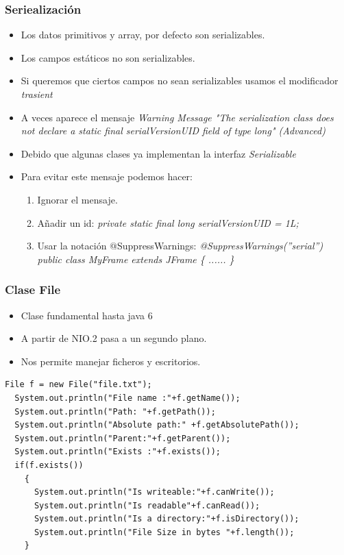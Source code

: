 \documentclass{beamer}
\begin{document}
\begin{frame}[fragile]
\frametitle{Seriealización}
\begin{itemize}[<+->]
\item Los datos primitivos y array, por defecto son serializables.
\item Los campos estáticos no son serializables.
\item Si queremos que ciertos campos no sean serializables usamos el modificador \emph{trasient}
\item A veces aparece el mensaje \emph{Warning Message "The serialization class does not declare a static final serialVersionUID field of type long" (Advanced)}
\item Debido que algunas clases ya implementan la interfaz \emph{Serializable}
\item Para evitar este mensaje podemos hacer:
\begin{enumerate}
\item Ignorar el mensaje.
\item Añadir un id: \emph{private static final long serialVersionUID = 1L;}
\item Usar la notación $@$SuppressWarnings: \emph{@SuppressWarnings(''serial'')
public class MyFrame extends JFrame \{ ...... \}}
\end{enumerate}
\end{itemize}
\end{frame}




\begin{frame}[fragile]
\frametitle{Clase File}
\begin{itemize}[<+->]
\item Clase fundamental hasta java 6
\item A partir de NIO.2 pasa a un segundo plano.
\item Nos permite manejar ficheros y escritorios.
\end{itemize}
\pause
\begin{small}
\begin{verbatim}
File f = new File("file.txt"); 
  System.out.println("File name :"+f.getName()); 
  System.out.println("Path: "+f.getPath()); 
  System.out.println("Absolute path:" +f.getAbsolutePath()); 
  System.out.println("Parent:"+f.getParent()); 
  System.out.println("Exists :"+f.exists()); 
  if(f.exists()) 
    { 
      System.out.println("Is writeable:"+f.canWrite()); 
      System.out.println("Is readable"+f.canRead()); 
      System.out.println("Is a directory:"+f.isDirectory()); 
      System.out.println("File Size in bytes "+f.length()); 
    } 
\end{verbatim}
\end{small}
\end{frame}
\end{document}
